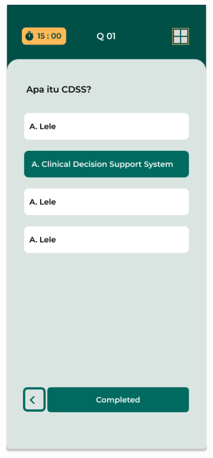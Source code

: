 \begin{figure}[H]
	\centering
	\begin{subfigure}[b]{0.23\textwidth}
		\centering
	  \includegraphics[width=\linewidth]{contents/chapter-3/images/HF-kuis1.png}

\end{subfigure}
\end{figure}
